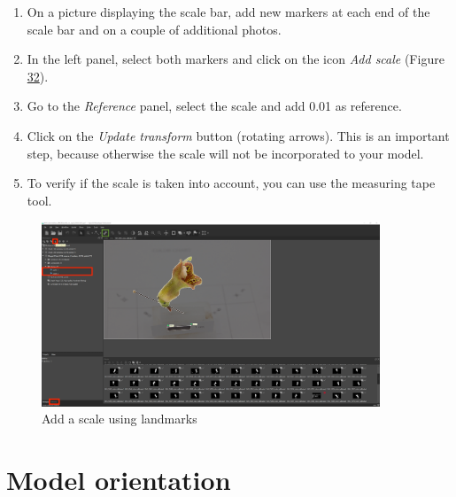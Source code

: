 \documentclass[
]{book}
\theoremstyle{definition}
\theoremstyle{definition}
\theoremstyle{definition}
\theoremstyle{definition}
\theoremstyle{remark}
\begin{document}
\begin{enumerate}
\def\labelenumi{\arabic{enumi}.}
\item
  On a picture displaying the scale bar, add new markers at each end
  of the scale bar and on a couple of additional photos.
\item
  In the left panel, select both markers and click on the icon \emph{Add
  scale} (Figure \protect\hyperlink{metashape_scale}{32}).
\item
  Go to the \emph{Reference} panel, select the scale and add 0.01 as
  reference.
\item
  Click on the \emph{Update transform} button (rotating arrows). This is an
  important step, because otherwise the scale will not be incorporated
  to your model.
\item
  To verify if the scale is taken into account, you can use the
  measuring tape tool.
\end{enumerate}

\begin{figure}
\hypertarget{metashape_scale}{%
\centering
\includegraphics[width=0.9\textwidth,height=\textheight]{Figures/metashape_add_scale_2.png}
\caption{Add a scale using
landmarks}\label{metashape_scale}
}
\end{figure}

\hypertarget{model-orientation}{%
\section{Model orientation}\label{model-orientation}}
\end{document}
